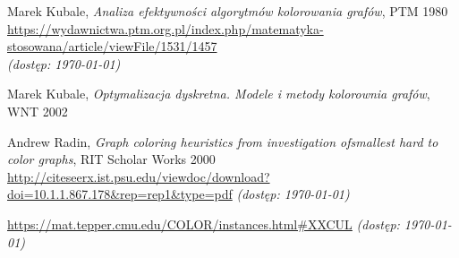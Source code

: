 \documentclass[10pt,a4paper]{article}
\begin{document}
	\begin{thebibliography}{0}
		Marek Kubale, \textit{Analiza efektywności algorytmów kolorowania grafów}, PTM 1980\\
		\url{https://wydawnictwa.ptm.org.pl/index.php/matematyka-stosowana/article/viewFile/1531/1457}\\
		\textit{(dostęp: \today)}
		
		Marek Kubale, \textit{Optymalizacja dyskretna. Modele i metody kolorownia grafów}, WNT 2002
		
		Andrew Radin, \textit{Graph coloring heuristics from investigation ofsmallest hard to color graphs}, RIT Scholar Works 2000
		\url{http://citeseerx.ist.psu.edu/viewdoc/download?doi=10.1.1.867.178\&rep=rep1\&type=pdf}
		\textit{(dostęp: \today)}
		
		\url{https://mat.tepper.cmu.edu/COLOR/instances.html#XXCUL}
		\textit{(dostęp: \today)}
		
		
	\end{thebibliography}
	
\end{document}
